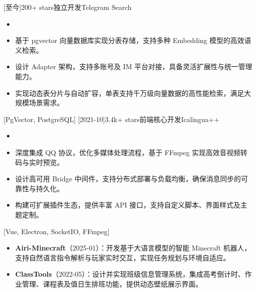 \documentclass[zh]{resume}
\begin{document}
\begin{projects}
  [至今]{200+ stars}{独立开发}{Telegram Search}{
    \begin{itemize}
      \item {}
      \item 基于 pgvector 向量数据库实现分表存储，支持多种 Embedding 模型的高效语义检索。
      \item 设计 Adapter 架构，支持多账号及 IM 平台对接，具备灵活扩展性与统一管理能力。
      \item 实现动态表分片与自动扩容，单表支持千万级向量数据的高性能检索，满足大规模场景需求。
    \end{itemize}
  }[PgVector, PostgreSQL]
  \separator{0.5ex}
  [2021-10]{3.4k+ stars}{前端核心开发}{Icalingua++}{
    \begin{itemize}
      \item {}
      \item 深度集成 QQ 协议，优化多媒体处理流程，基于 FFmpeg 实现高效音视频转码与实时预览。
      \item 设计高可用 Bridge 中间件，支持分布式部署与负载均衡，确保消息同步的可靠性与持久化。
      \item 构建可扩展插件生态，提供丰富 API 接口，支持自定义脚本、界面样式及主题定制。
    \end{itemize}
  }[Vue, Electron, SocketIO, FFmpeg]
\end{projects}

\begin{itemize}
  \item \textbf{Airi-Minecraft}（2025-01）：开发基于大语言模型的智能 Minecraft 机器人，支持自然语言指令解析与玩家实时交互，实现任务规划与环境自适应。
  \item \textbf{ClassTools}（2022-05）：设计并实现班级信息管理系统，集成高考倒计时、作业管理、课程表及值日生排班功能，提供动态壁纸展示界面。
\end{itemize}
\end{document}
